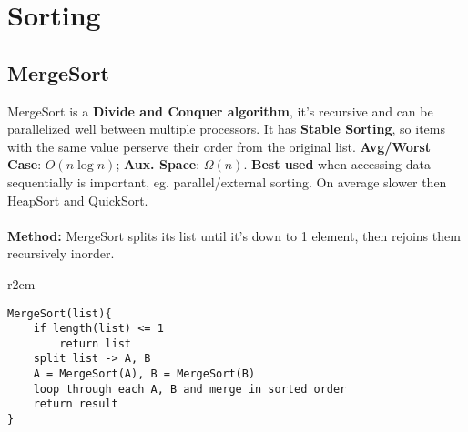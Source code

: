 \documentclass{article}
\begin{document}
\clearpage
\section{Sorting}


\subsection{MergeSort}
MergeSort is a {\bf Divide and Conquer algorithm}, it's recursive and can be parallelized well between multiple processors. It has {\bf Stable Sorting}, so items with the same value perserve their order from the original list. {\bf Avg/Worst Case}: $O(n \log n)$; {\bf Aux. Space}: $\Omega(n)$. {\bf Best used} when accessing data sequentially is important, eg. parallel/external sorting. On average slower then HeapSort and QuickSort.
\\ \\
{\bf Method:} MergeSort splits its list until it's down to 1 element, then rejoins them recursively inorder.

\begin{wrapfigure}{r}{2cm}
\end{wrapfigure}
\begin{lstlisting}[style=pseudo]
MergeSort(list){
	if length(list) <= 1
		return list
	split list -> A, B
	A = MergeSort(A), B = MergeSort(B)
	loop through each A, B and merge in sorted order
	return result
}
\end{lstlisting}
\vspace{10 mm}
\end{document}
